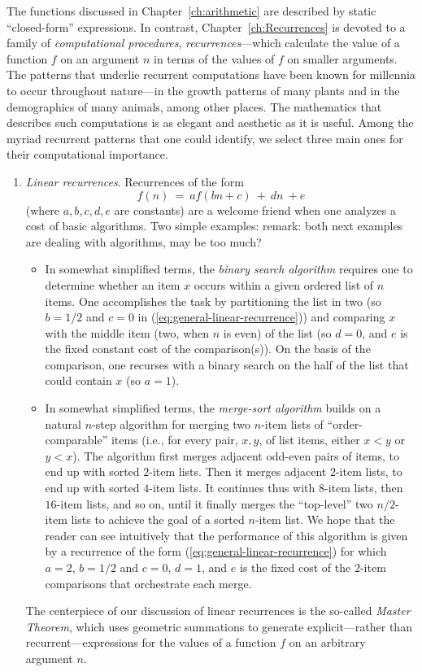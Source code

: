The functions discussed in Chapter~\ref{ch:arithmetic} are described
by static ``closed-form'' expressions.  In contrast,
Chapter~\ref{ch:Recurrences} is devoted to a family of {\em
  computational procedures}, {\it recurrences}---which calculate the
value of a function $f$ on an argument $n$ in terms of the values of
$f$ on smaller arguments.  The patterns that underlie recurrent
computations have been known for millennia to occur throughout
nature---in the growth patterns of many plants and in the demographics
of many animals, among other places.  The mathematics that describes
such computations is as elegant and aesthetic as it is useful.  Among
the myriad recurrent patterns that one could identify, we select three
main ones for their computational importance.
\begin{enumerate}
\item
{\it Linear recurrences}.  Recurrences of the form
\begin{equation}
\label{eq:general-linear-recurrence}
f(n) \ = \ a f(bn+c) \ + \ dn \ + e
\end{equation}
(where $a, b, c, d, e$ are constants) are a welcome friend when one
analyzes a cost of basic algorithms.  Two simple examples:
{\Denis remark: both next examples are dealing with algorithms, may be too much?}
  \begin{itemize}
  \item
In somewhat simplified terms, the {\em binary search algorithm}
requires one to determine whether an item $x$ occurs within a given
ordered list of $n$ items.  One accomplishes the task by partitioning
the list in two (so $b = 1/2$ and $c = 0$ in
(\ref{eq:general-linear-recurrence})) and comparing $x$ with the
middle item (two, when $n$ is even) of the list (so $d = 0$, and $e$
is the fixed constant cost of the comparison(s)).  On the basis of the
comparison, one recurses with a binary search on the half of the list
that could contain $x$ (so $a = 1$).
  \item
In somewhat simplified terms, the {\em merge-sort algorithm} builds on
a natural $n$-step algorithm for merging two $n$-item lists of
``order-comparable'' items (i.e., for every pair, $x,y$, of list
items, either $x < y$ or $y < x$).  The algorithm first merges
adjacent odd-even pairs of items, to end up with sorted $2$-item
lists.  Then it merges adjacent $2$-item lists, to end up with sorted
$4$-item lists.  It continues thus with $8$-item lists, then $16$-item
lists, and so on, until it finally merges the ``top-level'' two
$n/2$-item lists to achieve the goal of a sorted $n$-item list.  We
hope that the reader can see intuitively that the performance of this
algorithm is given by a recurrence of the form
(\ref{eq:general-linear-recurrence}) for which $a=2$, $b = 1/2$ and $c
= 0$, $d=1$, and $e$ is the fixed cost of the $2$-item comparisons that
orchestrate each merge.
  \end{itemize}
The centerpiece of our discussion of linear recurrences is the
so-called {\em Master Theorem}, which uses geometric summations to
generate explicit---rather than recurrent---expressions for the values
of a function $f$ on an arbitrary argument $n$.


\end{enumerate}
